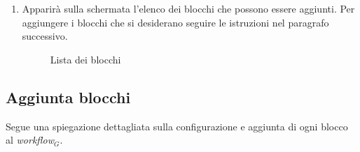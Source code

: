 \begin{enumerate}
\newpage
\item Apparirà sulla schermata l'elenco dei blocchi che possono essere aggiunti.
Per aggiungere i blocchi che si desiderano seguire le istruzioni nel paragrafo successivo.
\begin{figure}[!ht]
	\centering
	\caption{Lista dei blocchi}
\end{figure}

\end{enumerate}

\newpage
\subsection{Aggiunta blocchi}
Segue una spiegazione dettagliata sulla configurazione e aggiunta di ogni blocco al \textit{workflow$_{G}$}.\\

